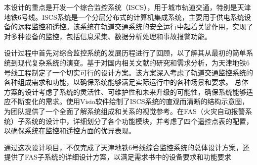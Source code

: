 \begin{cnabstract}
本设计的重点是开发一个综合监控系统（ISCS），用于城市轨道交通，特别是天津地铁6号线。ISCS系统是一个分层分布式的计算机集成系统，主要用于供电系统设备的远程监控和遥控。该系统在轨道交通系统的安全运行中起着关键作用，实现了对多种设备的监控，包括信息采集、数据分析处理和事故报警功能。

设计过程中首先对综合监控系统的发展历程进行了回顾，以了解其从最初的简单系统到现代复杂系统的演变。基于对国内相关文献的研究和需求分析，为天津地铁6号线工程制定了一个切实可行的设计方案。该方案深入考虑了轨道交通监控系统的各种组成需求和功能，以确保系统能够满足实际运行中的各种场景和要求。
总体方案的设计考虑了系统的灵活性、可维护性和未来升级的可能性，确保系统能够适应不断变化的需求。使用Visio软件绘制了ISCS系统的直观而清晰的结构示意图，为团队提供了一个全面了解系统组成和关系的视觉参考。在FAS（火灾自动报警系统）子系统的设计中，详细划分了各个功能模块，并考虑了四个遥控点表的配置，以确保系统在监控和遥控方面的优异表现。

通过这次设计项目，不仅完成了天津地铁6号线综合监控系统的总体设计方案，还提供了FAS子系统的详细设计方案，以满足需求书中的设备要求和功能要求
\end{cnabstract}
\vspace{1em}\par

